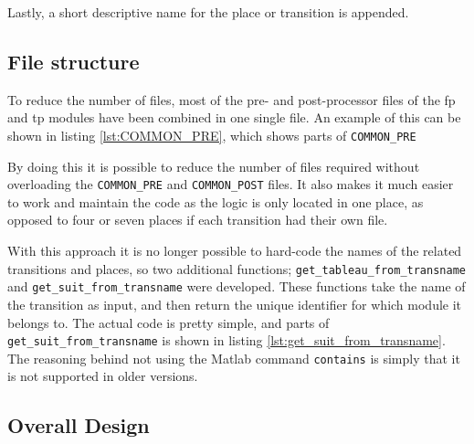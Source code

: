 \documentclass[runningheads,a4paper]{llncs}
\newcommand{\GPenSIM}{../GPenSIM}
\begin{document}
Lastly, a short descriptive name for the place or transition is appended.
\subsection{File structure}
\label{sec:2_file_structure}
To reduce the number of files, most of the pre- and post-processor files of the \ac{fp} and \ac{tp} modules have been combined in one single file. An example of this can be shown in listing \ref{lst:COMMON_PRE}, which shows parts of \verb!COMMON_PRE!


By doing this it is possible to reduce the number of files required without overloading the \verb!COMMON_PRE! and \verb!COMMON_POST! files. It also makes it much easier to work and maintain the code as the logic is only located in one place, as opposed to four or seven places if each transition had their own file.
\newline

With this approach it is no longer possible to hard-code the names of the related transitions and places, so two additional functions; \verb!get_tableau_from_transname! and \verb!get_suit_from_transname! were developed. These functions take the name of the transition as input, and then return the unique identifier for which module it belongs to. The actual code is pretty simple, and parts of \verb!get_suit_from_transname! is shown in listing \ref{lst:get_suit_from_transname}. The reasoning behind not using the Matlab command \verb!contains! is simply that it is not supported in older versions.

\clearpage
\subsection{Overall Design}
\end{document}
